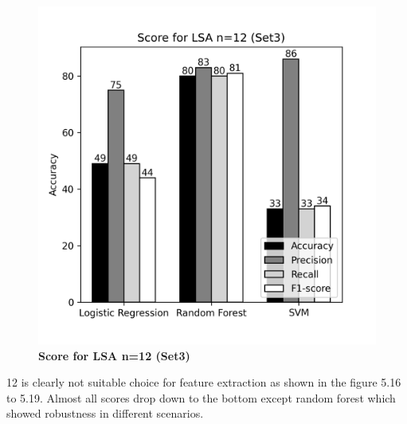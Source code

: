 \documentclass[12pt]{report}
\begin{document}
\begin{figure}[!htb]
\begin{minipage}{0.48\textwidth}
                  \includegraphics[scale=0.55]{plots/Score for LSA n=12 (Set3).png}
                  \caption{\textbf{Score for LSA n=12 (Set3)}}\label{Fig:typo2}
                \end{minipage}
             \end{figure}

            12 is clearly not suitable choice for feature extraction as shown in the figure 5.16 to 5.19. Almost all scores drop down to the bottom except random forest which
            showed robustness in different scenarios.
\end{document}
